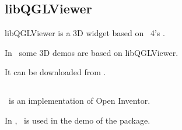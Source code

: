 








\subsection{libQGLViewer \label{thirdparty:libQGLViewer}}

libQGLViewer is a 3D widget based on \qt~4's .

In \cgal\ some 3D demos are based on libQGLViewer. 

It can be downloaded from \libqglviewerpage.

\subsection{\coin \label{thirdparty:Coin}}

\coin\ is an implementation of Open Inventor.  

In \cgal, \coin\ is used in the demo
of the  package. 

